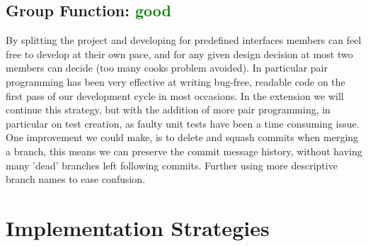 \documentclass[11pt]{article}
\begin{document}
    \subsection*{Group Function: \textcolor{green}{good}}
        By splitting the project and developing for predefined interfaces members can feel free to develop at their own pace, and for any given design decision at most two members can decide (too many cooks problem avoided).
        In particular pair programming has been very effective at writing bug-free, readable code on the first pass of our development cycle in most occasions.
        \newline\newline
        In the extension we will continue this strategy, but with the addition of more pair programming, in particular on test creation, as faulty unit tests have been a time consuming issue.
        \newline\newline
        One improvement we could make, is to delete and squash commits when merging a branch, this means we can preserve the commit message history, without having many 'dead' branches left following commits. Further using more descriptive branch names to ease confusion.

\section{Implementation Strategies}
\end{document}
